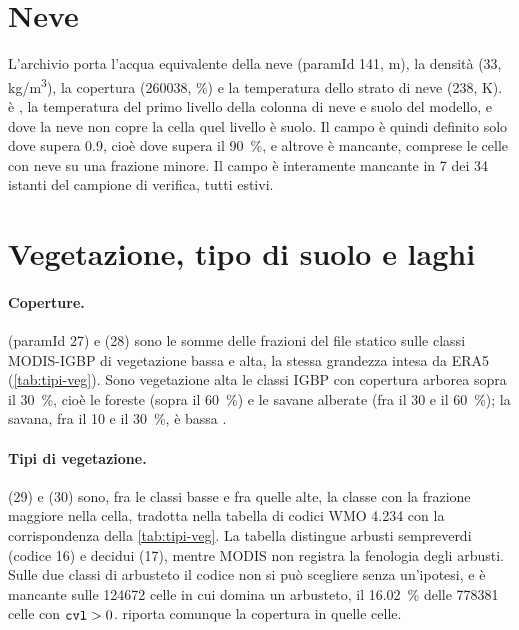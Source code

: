 \section{Neve}
\label{sec:neve}

L'archivio porta l'acqua equivalente della neve  (paramId 141, \si{m}), la densità
 (33, \si{kg/m^3}), la copertura  (260038, \si{\percent}) e la temperatura
dello strato di neve  (238, \si{K}).  è , la temperatura del
primo livello della colonna di neve e suolo del modello, e dove la neve non copre la cella quel
livello è suolo. Il campo è quindi definito solo dove  supera \num{0.9}, cioè dove
 supera il \SI{90}{\percent}, e altrove è mancante, comprese le celle con neve su una
frazione minore. Il campo è interamente mancante in 7 dei 34 istanti del campione di verifica, tutti
estivi.

\section{Vegetazione, tipo di suolo e laghi}
\label{sec:vegetazione}

\paragraph{Coperture.}  (paramId 27) e  (28) sono le somme delle frazioni del
file statico sulle classi MODIS-IGBP di vegetazione bassa e alta, la stessa grandezza intesa da ERA5
(\cref{tab:tipi-veg}). Sono vegetazione alta le classi IGBP con copertura arborea sopra il
\SI{30}{\percent}, cioè le foreste (sopra il \SI{60}{\percent}) e le savane alberate (fra il 30 e il
\SI{60}{\percent}); la savana, fra il 10 e il \SI{30}{\percent}, è bassa \parencite{modis2022}.

\paragraph{Tipi di vegetazione.}  (29) e  (30) sono, fra le classi basse e fra
quelle alte, la classe con la frazione maggiore nella cella, tradotta nella tabella di codici WMO
4.234 con la corrispondenza della \cref{tab:tipi-veg}. La tabella distingue arbusti sempreverdi
(codice 16) e decidui (17), mentre MODIS non registra la fenologia degli arbusti. Sulle due classi di
arbusteto il codice non si può scegliere senza un'ipotesi, e  è mancante sulle
\num{124672} celle in cui domina un arbusteto, il \SI{16.02}{\percent} delle \num{778381} celle con
$\campo{cvl} > 0$.  riporta comunque la copertura in quelle celle.

